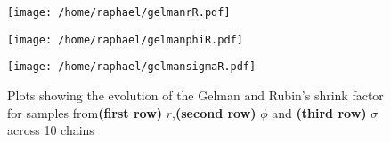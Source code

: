 \documentclass{article}
\begin{document}
	\begin{figure}[htb]
		\centering
		\begin{minipage}{0.6\textwidth}
			\centering
			\texttt{[image: /home/raphael/gelmanrR.pdf]}
		\end{minipage}
		\begin{minipage}{0.6\textwidth}
			\centering
			\texttt{[image: /home/raphael/gelmanphiR.pdf]}
		\end{minipage}
		\begin{minipage}{0.6\textwidth}
			\centering
			\texttt{[image: /home/raphael/gelmansigmaR.pdf]}
		\end{minipage}
		\caption{Plots showing the evolution of the  Gelman and Rubin's shrink factor for samples from\textbf{(first row)} $r$,\textbf{(second row)} $\phi$ and \textbf{(third row)} $\sigma$ across 10 chains}
		\label{fig:gelman}
	\end{figure}

\clearpage

	
{}
\end{document}
